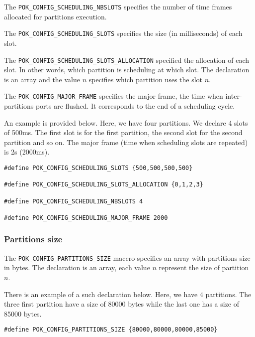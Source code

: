       The \texttt{POK\_CONFIG\_SCHEDULING\_NBSLOTS} specifies the number of time
      frames allocated for partitions execution.

      The \texttt{POK\_CONFIG\_SCHEDULING\_SLOTS} specifies the size (in
      milliseconds) of each slot.

      The \texttt{POK\_CONFIG\_SCHEDULING\_SLOTS\_ALLOCATION} specified the
      allocation of each slot. In other words, which partition is scheduling at
      which slot. The declaration is an array and the value $n$ specifies which
      partition uses the slot $n$.

      The \texttt{POK\_CONFIG\_MAJOR\_FRAME} specifies the major frame, the time
      when inter-partitions ports are flushed. It corresponds to the end of a
      scheduling cycle.

      An example is provided below. Here, we have four partitions. We declare 4
      slots of 500ms. The first slot is for the first partition, the second slot
      for the second partition and so on. The major frame (time when scheduling
      slots are repeated) is 2s (2000ms).

\begin{verbatim}
#define POK_CONFIG_SCHEDULING_SLOTS {500,500,500,500}

#define POK_CONFIG_SCHEDULING_SLOTS_ALLOCATION {0,1,2,3}

#define POK_CONFIG_SCHEDULING_NBSLOTS 4

#define POK_CONFIG_SCHEDULING_MAJOR_FRAME 2000
\end{verbatim}


      \subsubsection{Partitions size}
      The \texttt{POK\_CONFIG\_PARTITIONS\_SIZE} maccro specifies an array with
      partitions size in bytes. The declaration is an array, each value $n$
      represent the size of partition $n$.

      There is an example of a such declaration below. Here, we have 4
      partitions. The three first partition have a size of 80000 bytes while the
      last one has a size of 85000 bytes.

\begin{verbatim}
#define POK_CONFIG_PARTITIONS_SIZE {80000,80000,80000,85000}
\end{verbatim}


